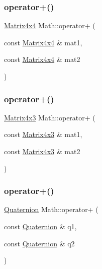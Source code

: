 \mbox{\label{namespace_math_a389dadeebac6c85cbab4622add8901a5}} 
\subsubsection{\texorpdfstring{operator+()}{operator+()}\hspace{0.1cm}{\footnotesize\ttfamily [4/6]}}
{\footnotesize\ttfamily \mbox{\hyperlink{struct_math_1_1_matrix4x4}{Matrix4x4}} Math\+::operator+ (\begin{DoxyParamCaption}\item[{const \mbox{\hyperlink{struct_math_1_1_matrix4x4}{Matrix4x4}} \&}]{mat1,  }\item[{const \mbox{\hyperlink{struct_math_1_1_matrix4x4}{Matrix4x4}} \&}]{mat2 }\end{DoxyParamCaption})}

\mbox{\label{namespace_math_a959ebc86863f66d4fb3bc96f3b0ad6be}} 
\subsubsection{\texorpdfstring{operator+()}{operator+()}\hspace{0.1cm}{\footnotesize\ttfamily [5/6]}}
{\footnotesize\ttfamily \mbox{\hyperlink{struct_math_1_1_matrix4x3}{Matrix4x3}} Math\+::operator+ (\begin{DoxyParamCaption}\item[{const \mbox{\hyperlink{struct_math_1_1_matrix4x3}{Matrix4x3}} \&}]{mat1,  }\item[{const \mbox{\hyperlink{struct_math_1_1_matrix4x3}{Matrix4x3}} \&}]{mat2 }\end{DoxyParamCaption})}

\mbox{\label{namespace_math_aa4702dd289093f85efd2ce191d042773}} 
\subsubsection{\texorpdfstring{operator+()}{operator+()}\hspace{0.1cm}{\footnotesize\ttfamily [6/6]}}
{\footnotesize\ttfamily \mbox{\hyperlink{struct_math_1_1_quaternion}{Quaternion}} Math\+::operator+ (\begin{DoxyParamCaption}\item[{const \mbox{\hyperlink{struct_math_1_1_quaternion}{Quaternion}} \&}]{q1,  }\item[{const \mbox{\hyperlink{struct_math_1_1_quaternion}{Quaternion}} \&}]{q2 }\end{DoxyParamCaption})}

